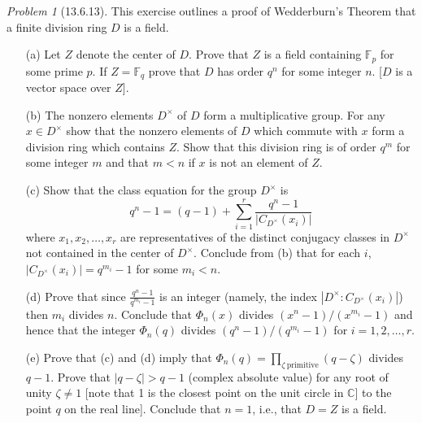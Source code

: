 \documentclass[10pt]{article}
\newcommand{\bb}[1]{\mathbb{#1}}
\theoremstyle{remark}
\newtheorem{problem}{Problem}
\theoremstyle{remark}
\begin{document}
\begin{problem}[13.6.13]
  This exercise outlines a proof of Wedderburn's Theorem that a
  finite division ring $D$ is a field.
  \begin{enumerate}
  \item[(a)] Let $Z$ denote the center of $D$. Prove that $Z$ is
    a field containing $\bb{F}_p$ for some prime $p$. If $Z=\bb{F}_q$
    prove that $D$ has order $q^n$ for some integer $n$.
    [$D$ is a vector space over $Z$].
    
  \item[(b)] The nonzero elements $D^\times$ of $D$ form a multiplicative group.
    For any $x\in D^\times$ show that the nonzero elements of $D$ which commute
    with $x$ form a division ring which contains $Z$. Show that this
    division ring is of order $q^m$ for some integer $m$ and that $m<n$
    if $x$ is not an element of $Z$.
    
  \item[(c)] Show that the class equation for the group $D^\times$ is
    \[
      q^n-1=(q-1)+\sum_{i=1}^r\frac{q^n-1}{|C_{D^\times}(x_i)|}
    \]
    where $x_1,x_2,\ldots,x_r$ are representatives of the distinct
    conjugacy classes in $D^\times$ not contained in the center of $D^\times$.
    Conclude from (b) that for each $i$, $|C_{D^\times}(x_i)|=q^{m_i}-1$
    for some $m_i<n$.
    
  \item[(d)] Prove that since $\frac{q^n-1}{q^{m_i}-1}$ is an integer
    (namely, the index $|D^\times:C_{D^\times}(x_i)|$) then $m_i$ divides $n$.
    Conclude that $\Phi_n(x)$ divides $(x^n-1)/(x^{m_i}-1)$ and hence that the
    integer $\Phi_n(q)$ divides $(q^n-1)/(q^{m_i}-1)$ for $i=1,2,\ldots,r$.
    
  \item[(e)] Prove that (c) and (d) imply that
    $\Phi_n(q)=\prod_{\zeta\ \mathrm{primitive}}(q-\zeta)$ divides $q-1$.
    Prove that $|q-\zeta|>q-1$ (complex absolute value) for any root
    of unity $\zeta\neq 1$ [note that 1 is the closest point on the unit circle
    in $\bb{C}$] to the point $q$ on the real line]. Conclude that
    $n=1$, i.e., that $D=Z$ is a field.
  \end{enumerate}
\end{problem}
\end{document}
